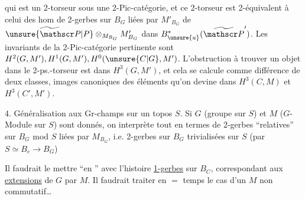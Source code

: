qui est un 2-torseur sous une 2-Pic-catégorie, et ce 2-torseur est 2-équivalent à celui des hom de 2-gerbes sur $B_G$ liées par $M'_{B_G}$ de
$\widetilde{\unsure{\mathscr P|P}}\otimes_{M_{B_G}}M'_{B_G}$ dans $B_{\unsure{u}}^*(\widetilde{\mathscr P}')$. Les invariants de la 2-Pic-catégorie pertinente sont $H^2(G,M'),H^1(G,M'),H^0(\unsure{C|G},M')$. L'obstruction à trouver un objet dans le 2-ps.-torseur est dans $H^3(G,M')$, et cela se calcule comme différence de deux classes, images canoniques des éléments qu'on devine dans $H^3(C,M)$ et $H^3(C',M')$.

4. Généralisation aux Gr-champs sur un topos $S$.  Si $G$ (groupe sur $S$) et $M$ ($G$-Module sur $S$) sont donnés, on interprète tout en termes de 2-gerbes ``relatives'' sur $B_G$ mod $S$ liées par $M_{B_G}$, i.e. 2-gerbes sur $B_G$ trivialisées sur $S$ (par $S\simeq B_e\longrightarrow B_G$)

Il faudrait le mettre ``en '' avec l'histoire  \uline{1-gerbes}  sur $B_C$, correspondant aux \uline{extensions} de $G$ par $M$. Il faudrait traiter en $=$ temps le cas d'un $M$ non commutatif\ldots
